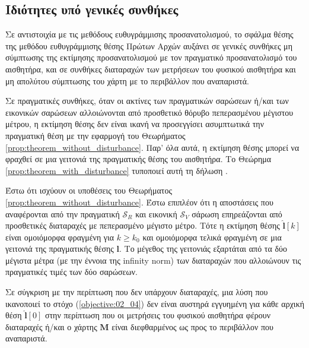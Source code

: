\subsection{Ιδιότητες υπό γενικές συνθήκες}
\label{subsection:02_04_03:02}

Σε αντιστοιχία με τις μεθόδους ευθυγράμμισης προσανατολισμού, το σφάλμα θέσης
της μεθόδου ευθυγράμμισης θέσης Πρώτων Αρχών αυξάνει σε γενικές συνθήκες μη
σύμπτωσης της εκτίμησης προσανατολισμού με τον πραγματικό προσανατολισμό του
αισθητήρα, και σε συνθήκες διαταραχών των μετρήσεων του φυσικού αισθητήρα και
μη απολύτου σύμπτωσης του χάρτη με το περιβάλλον που αναπαριστά.

Σε πραγματικές συνθήκες, όταν οι ακτίνες των πραγματικών σαρώσεων ή/και των
εικονικών σαρώσεων αλλοιώνονται από προσθετικό θόρυβο πεπερασμένου μέγιστου
μέτρου, η εκτίμηση θέσης δεν είναι ικανή να προσεγγίσει ασυμπτωτικά την
πραγματική θέση με την εφαρμογή του Θεωρήματος
\ref{prop:theorem_without_disturbance}. Παρ' όλα αυτά, η εκτίμηση θέσης μπορεί
να φραχθεί σε μια γειτονιά της πραγματικής θέσης του αισθητήρα. Το Θεώρημα
\ref{prop:theorem_with_disturbance} τυποποιεί αυτή τη δήλωση
\cite{Filotheou2022d}.

\begin{bw_box}
\begin{theorem}
  \label{prop:theorem_with_disturbance}
  Έστω ότι ισχύουν οι υποθέσεις του Θεωρήματος
  \ref{prop:theorem_without_disturbance}. Έστω επιπλέον ότι η αποστάσεις που
  αναφέρονται από την πραγματική $\mathcal{S}_R$ και εικονική $\mathcal{S}_V$
  σάρωση επηρεάζονται από προσθετικές διαταραχές με πεπερασμένο μέγιστο μέτρο.
  Τότε η εκτίμηση θέσης $\hat{\bm{l}}[k]$ είναι ομοιόμορφα φραγμένη για $k \geq
  k_0$ και ομοιόμορφα τελικά φραγμένη σε μια γειτονιά της πραγματικής θέσης
  $\bm{l}$. Το μέγεθος της γειτονιάς εξαρτάται από τα δύο μέγιστα μέτρα
  (με την έννοια της infinity norm) των διαταραχών που αλλοιώνουν τις
  πραγματικές τιμές των δύο σαρώσεων.
\end{theorem}
\end{bw_box}

\begin{corollary}
  Σε σύγκριση με την περίπτωση που δεν υπάρχουν διαταραχές, μια λύση που
  ικανοποιεί το στόχο (\ref{objective:02_04}) δεν είναι αυστηρά εγγυημένη για
  κάθε αρχική θέση $\hat{\bm{l}}[0]$ στην περίπτωση που οι μετρήσεις του φυσικού
  αισθητήρα φέρουν διαταραχές ή/και ο χάρτης $\bm{M}$ είναι διεφθαρμένος ως προς
  το περιβάλλον που αναπαριστά.
\end{corollary}

